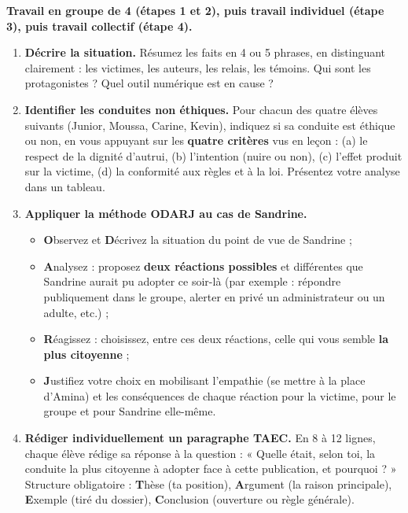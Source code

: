 \documentclass[11pt]{article}
\newcommand{\cle}[1]{{\popxbold\color{popdark}#1}}
\newcounter{popsec}
\newcounter{popsub}
\newcommand{\courssub}[1]{%
  \stepcounter{popsub}%
  \par\vspace{9pt}\noindent{\popxbold\fontsize{11.5}{13}\selectfont\color{popink}{\color{poporange}\thepopsec.\thepopsub}\hspace{6pt}#1}\par\nopagebreak\vspace{4pt}
}
\begin{document}
\courssub{Consignes}

\textbf{Travail en groupe de 4 (étapes 1 et 2), puis travail individuel (étape 3), puis travail collectif (étape 4).}

\begin{enumerate}
\item \textbf{Décrire la situation.} Résumez les faits en 4 ou 5 phrases, en distinguant clairement : les victimes, les auteurs, les relais, les témoins. Qui sont les protagonistes ? Quel outil numérique est en cause ?

\item \textbf{Identifier les conduites non éthiques.} Pour chacun des quatre élèves suivants (Junior, Moussa, Carine, Kevin), indiquez si sa conduite est éthique ou non, en vous appuyant sur les \textbf{quatre critères} vus en leçon : (a) le respect de la dignité d'autrui, (b) l'intention (nuire ou non), (c) l'effet produit sur la victime, (d) la conformité aux règles et à la loi. Présentez votre analyse dans un tableau.

\item \textbf{Appliquer la méthode ODARJ au cas de Sandrine.}
\begin{itemize}
\item \textbf{O}bservez et \textbf{D}écrivez la situation du point de vue de Sandrine ;
\item \textbf{A}nalysez : proposez \textbf{deux réactions possibles} et différentes que Sandrine aurait pu adopter ce soir-là (par exemple : répondre publiquement dans le groupe, alerter en privé un administrateur ou un adulte, etc.) ;
\item \textbf{R}éagissez : choisissez, entre ces deux réactions, celle qui vous semble \textbf{la plus citoyenne} ;
\item \textbf{J}ustifiez votre choix en mobilisant l'\cle{empathie} (se mettre à la place d'Amina) et les conséquences de chaque réaction pour la victime, pour le groupe et pour Sandrine elle-même.
\end{itemize}

\item \textbf{Rédiger individuellement un paragraphe TAEC.} En 8 à 12 lignes, chaque élève rédige sa réponse à la question : « Quelle était, selon toi, la conduite la plus citoyenne à adopter face à cette publication, et pourquoi ? » Structure obligatoire : \textbf{T}hèse (ta position), \textbf{A}rgument (la raison principale), \textbf{E}xemple (tiré du dossier), \textbf{C}onclusion (ouverture ou règle générale).


\end{enumerate}
\end{document}
